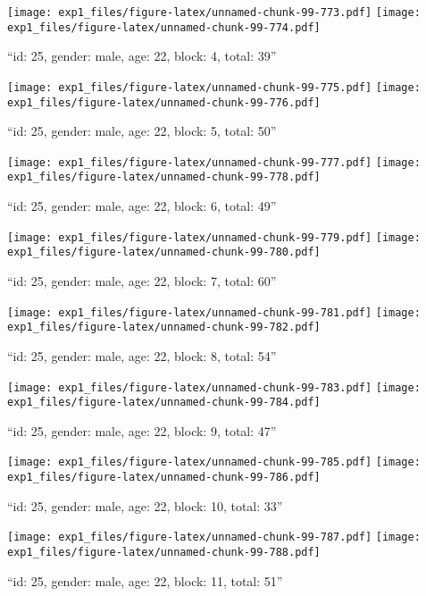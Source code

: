 \documentclass[,]{article}
\begin{document}
\texttt{[image: exp1\_files/figure-latex/unnamed-chunk-99-773.pdf]}
\texttt{[image: exp1\_files/figure-latex/unnamed-chunk-99-774.pdf]}

\newpage
[1] 

``id: 25, gender: male, age: 22, block: 4, total: 39''

\texttt{[image: exp1\_files/figure-latex/unnamed-chunk-99-775.pdf]}
\texttt{[image: exp1\_files/figure-latex/unnamed-chunk-99-776.pdf]}

\newpage
[1] 

``id: 25, gender: male, age: 22, block: 5, total: 50''

\texttt{[image: exp1\_files/figure-latex/unnamed-chunk-99-777.pdf]}
\texttt{[image: exp1\_files/figure-latex/unnamed-chunk-99-778.pdf]}

\newpage
[1] 

``id: 25, gender: male, age: 22, block: 6, total: 49''

\texttt{[image: exp1\_files/figure-latex/unnamed-chunk-99-779.pdf]}
\texttt{[image: exp1\_files/figure-latex/unnamed-chunk-99-780.pdf]}

\newpage
[1] 

``id: 25, gender: male, age: 22, block: 7, total: 60''

\texttt{[image: exp1\_files/figure-latex/unnamed-chunk-99-781.pdf]}
\texttt{[image: exp1\_files/figure-latex/unnamed-chunk-99-782.pdf]}

\newpage
[1] 

``id: 25, gender: male, age: 22, block: 8, total: 54''

\texttt{[image: exp1\_files/figure-latex/unnamed-chunk-99-783.pdf]}
\texttt{[image: exp1\_files/figure-latex/unnamed-chunk-99-784.pdf]}

\newpage
[1] 

``id: 25, gender: male, age: 22, block: 9, total: 47''

\texttt{[image: exp1\_files/figure-latex/unnamed-chunk-99-785.pdf]}
\texttt{[image: exp1\_files/figure-latex/unnamed-chunk-99-786.pdf]}

\newpage
[1] 

``id: 25, gender: male, age: 22, block: 10, total: 33''

\texttt{[image: exp1\_files/figure-latex/unnamed-chunk-99-787.pdf]}
\texttt{[image: exp1\_files/figure-latex/unnamed-chunk-99-788.pdf]}

\newpage
[1] 

``id: 25, gender: male, age: 22, block: 11, total: 51''
\end{document}
